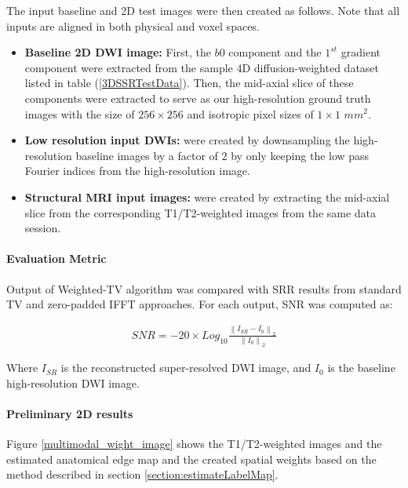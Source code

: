 The input baseline and 2D test images were then created as follows. Note that all inputs are aligned in both physical and voxel spaces.

\begin{itemize}
\item[ \textbf{}]{
       \textbf{Baseline 2D DWI image:}
       First, the $b0$ component and the $1^{st}$ gradient component were extracted from the sample 4D diffusion-weighted dataset listed in table (\ref{3DSSRTestData}).
       Then, the mid-axial slice of these components were extracted to serve as our high-resolution ground truth images with the size of $256 \times 256$ and isotropic pixel sizes of $1 \times 1$ $mm^2$.
       }
\item[ \textbf{}]{
       \textbf{Low resolution input DWIs:}
        were created by downsampling the high-resolution baseline images by a factor of $2$ by only keeping the low pass Fourier indices from the high-resolution image.
        }
\item[ \textbf{}]{
       \textbf{Structural MRI input images:}
        were created by extracting the mid-axial slice from the corresponding T1/T2-weighted images from the same data session.
        }
\end{itemize}

\paragraph{Evaluation Metric}
Output of Weighted-TV algorithm was compared with SRR results from standard TV and zero-padded IFFT approaches.
For each output, SNR was computed as:

\begin{equation}
\label{eq:snr}
\begin{gathered}
SNR = -20\times Log_{10} \frac{\left \| I_{SR} - I_0 \right \|_{2}}{\left \| I_0 \right \|_{2}}
\end{gathered}
\end{equation}

Where $I_{SR}$ is the reconstructed super-resolved DWI image, and $I_0$ is the baseline high-resolution DWI image.

\paragraph{Preliminary 2D results}
Figure \ref{multimodal_wight_image} shows the T1/T2-weighted images and the estimated anatomical edge map and the created spatial weights based on the method described in section \ref{section:estimateLabelMap}.

